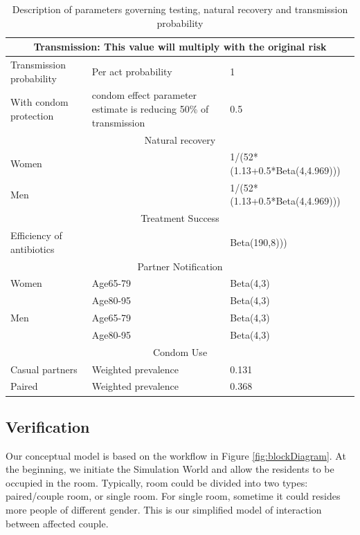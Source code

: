 \documentclass{article}
\begin{document}
\begin{normalsize}
\begin{table}[H]
\begin{tabular}{ |p{5cm}|p{7cm}|p{5cm}| }
		\multicolumn{3}{|c|}{Transmission: This value will multiply with the original risk} \\
		\hline
		Transmission probability & Per act probability & 1\\
		With condom protection & condom effect parameter estimate is reducing 50\% of transmission& 0.5\\
		\hline
		
		\multicolumn{3}{|c|}{Natural recovery} \\
		\hline
		Women & & 1/(52*(1.13+0.5*Beta(4,4.969)))\\
		Men & & 1/(52*(1.13+0.5*Beta(4,4.969)))\\
		
		\hline
		
		\multicolumn{3}{|c|}{Treatment Success} \\
		\hline
		Efficiency of antibiotics & & Beta(190,8)))\\
		\hline
		
		\multicolumn{3}{|c|}{Partner Notification} \\
		\hline
		Women&Age65-79&Beta(4,3)\\
		&Age80-95&Beta(4,3)
		\\
		Men&Age65-79&Beta(4,3)\\
		&Age80-95&Beta(4,3)\\
		\hline
		\multicolumn{3}{|c|}{Condom Use} \\
		\hline
		Casual partners&Weighted prevalence & 0.131\\
		Paired & Weighted prevalence & 0.368
		\\
		\hline
			
		
	\end{tabular}

	\caption{Description of parameters governing testing, natural recovery and transmission probability}
	\label{tab:parameter3}
\end{table}

\subsection{Verification}
Our conceptual model is based on the workflow in Figure \ref{fig:blockDiagram}. At the beginning, we initiate the Simulation World and allow the residents to be occupied in the room. Typically, room could be divided into two types: paired/couple room, or single room. For single room, sometime it could resides more people of different gender. This is our simplified model of interaction between affected couple.


\end{normalsize}
\end{document}
